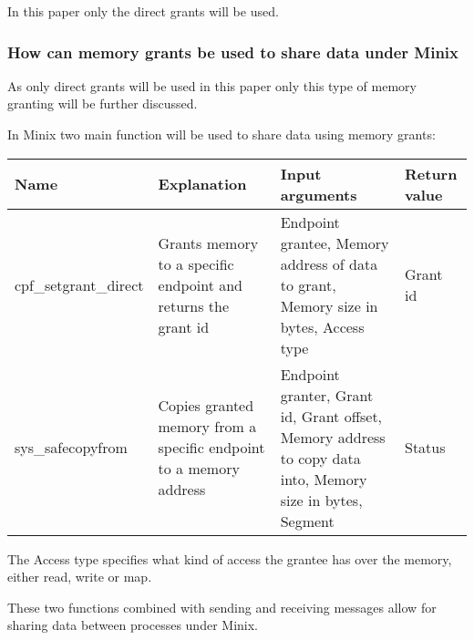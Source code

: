 In this paper only the direct grants will be used.

\hypertarget{how-can-memory-grants-be-used-to-share-data-under-minix}{%
\subsubsection{How can memory grants be used to share data under
Minix}\label{how-can-memory-grants-be-used-to-share-data-under-minix}}

As only direct grants will be used in this paper only this type of
memory granting will be further discussed.

In Minix two main function will be used to share data using memory
grants:

\begin{longtable}[]{@{}llll@{}}
\toprule
\begin{minipage}[b]{0.11\columnwidth}\raggedright
Name\strut
\end{minipage} & \begin{minipage}[b]{0.23\columnwidth}\raggedright
Explanation\strut
\end{minipage} & \begin{minipage}[b]{0.30\columnwidth}\raggedright
Input arguments\strut
\end{minipage} & \begin{minipage}[b]{0.25\columnwidth}\raggedright
Return value\strut
\end{minipage}\tabularnewline
\midrule
\endhead
\begin{minipage}[t]{0.11\columnwidth}\raggedright
cpf\_setgrant\_direct\strut
\end{minipage} & \begin{minipage}[t]{0.23\columnwidth}\raggedright
Grants memory to a specific endpoint and returns the grant id\strut
\end{minipage} & \begin{minipage}[t]{0.30\columnwidth}\raggedright
Endpoint grantee, Memory address of data to grant, Memory size in bytes,
Access type\strut
\end{minipage} & \begin{minipage}[t]{0.25\columnwidth}\raggedright
Grant id\strut
\end{minipage}\tabularnewline
\begin{minipage}[t]{0.11\columnwidth}\raggedright
sys\_safecopyfrom\strut
\end{minipage} & \begin{minipage}[t]{0.23\columnwidth}\raggedright
Copies granted memory from a specific endpoint to a memory address\strut
\end{minipage} & \begin{minipage}[t]{0.30\columnwidth}\raggedright
Endpoint granter, Grant id, Grant offset, Memory address to copy data
into, Memory size in bytes, Segment\strut
\end{minipage} & \begin{minipage}[t]{0.25\columnwidth}\raggedright
Status\strut
\end{minipage}\tabularnewline
\bottomrule
\end{longtable}

The Access type specifies what kind of access the grantee has over the
memory, either read, write or map.

These two functions combined with sending and receiving messages allow
for sharing data between processes under Minix.
